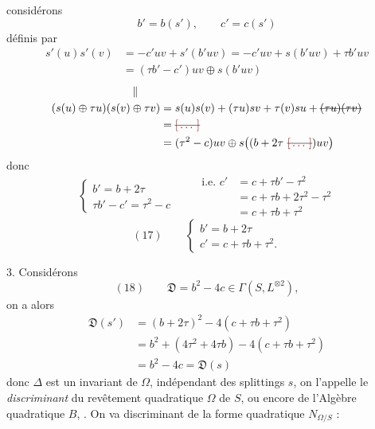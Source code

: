 \documentclass[11pt,a4paper]{article}
\begin{document}
considérons
\[
b' = b(s'), \qquad c' = c(s')
\]
définis par
\[
\begin{aligned}
s'(u)s'(v) &= -c'uv + s'(b'uv) = -c'uv + s(b'uv) + \tau b'uv\\
&= (\tau b' - c')uv \oplus s(b'uv)
\end{aligned}
\]
\[
\begin{aligned}
\Vert\qquad&\\
(s(u) \oplus \tau u)(s(v) \oplus \tau v) &= s(u)s(v) + (\tau u)s v + \tau(v) s u + \text{\struck{$(\tau u)(\tau v)$}}\\
&= \text{\struck{\ill{}}}\\
&= (\tau^2 - c)uv \oplus s\bigl((b + 2\tau\ \text{\struck{\ill{}}})uv\bigr)
\end{aligned}
\]
donc
\[
\begin{cases}
b' = b + 2\tau\\
\tau b' - c' = \tau^2 - c
\end{cases}
\qquad
\begin{aligned}
\text{i.e. } c' &= c + \tau b' - \tau^2\\
&= c + \tau b + 2\tau^2 - \tau^2\\
&= c + \tau b + \tau^2
\end{aligned}
\]
\[
(17)\qquad
\begin{cases}
b' = b + 2\tau\\
c' = c + \tau b + \tau^2 .
\end{cases}
\]

3. Considérons
\[
(18)\qquad \mathfrak{D} = b^2 - 4c \in \Gamma(S, L^{\otimes 2}) ,
\]
on a alors
\[
\begin{aligned}
\mathfrak{D}(s') &= (b + 2\tau)^2 - 4(c + \tau b + \tau^2)\\
&= b^2 + (4\tau^2 + 4\tau b) - 4(c + \tau b + \tau^2)\\
&= b^2 - 4c = \mathfrak{D}(s)
\end{aligned}
\]
donc $\Delta$ est un invariant de $\Omega$, indépendant des splittings $s$, on l'appelle le \emph{discriminant} du revêtement quadratique $\Omega$ de $S$, ou encore de l'Algèbre quadratique $B$, . On va  \add{\ill{}} discriminant de la forme quadratique $N_{\Omega/S}$ :   
\end{document}
